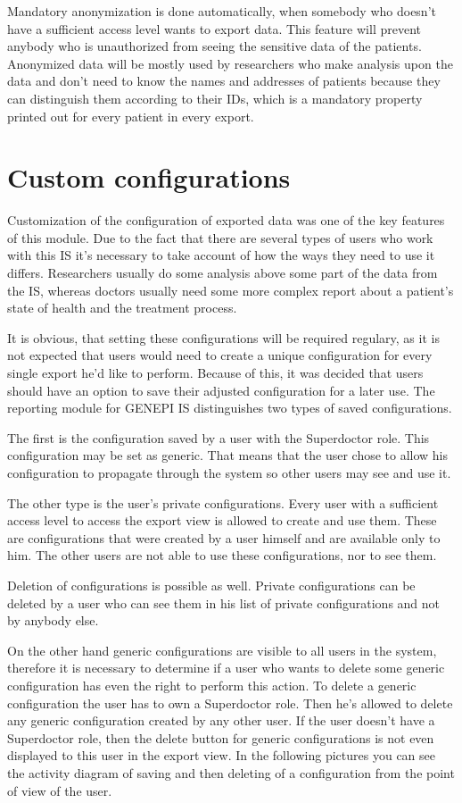 \documentclass[thesis=B,english]{FITthesis}[2012/10/20]
\begin{document}
Mandatory anonymization is done automatically, when somebody who doesn't have a sufficient access level wants to export data. This feature will prevent anybody who is unauthorized from seeing the sensitive data of the patients. Anonymized data will be mostly used by researchers who make analysis upon the data and don't need to know the names and addresses of patients because they can distinguish them according to their IDs, which is a mandatory property  printed out for every patient in every export.
\section{Custom configurations}
Customization of the configuration of exported data was one of the key features of this module. Due to the fact that there are several types of users who work with this IS it's necessary to take account of how the ways they need to use it differs. Researchers usually do some analysis above some part of the data from the IS, whereas doctors usually need some more complex report about a patient's state of health and the treatment process.

It is obvious, that setting these configurations will be required regulary, as it is not expected that users would need to create a unique configuration for every single export he'd like to perform. Because of this, it was decided that users should have an option to save their adjusted configuration for a later use. The reporting module for GENEPI IS distinguishes two types of saved configurations.

The first is the configuration saved by a user with the Superdoctor role. This configuration may be set as generic. That means that the user chose to allow his configuration to propagate through the system so other users may see and use it.

The other type is the user's private configurations. Every user with a sufficient access level to access the export view is allowed to create and use them. These are configurations that were created by a user himself and are available only to him. The other users are not able to use these configurations, nor to see them.

Deletion of configurations is possible as well. Private configurations can be deleted by a user who can see them in his list of private configurations and not by anybody else. 

On the other hand generic configurations are visible to all users in the system, therefore it is necessary to determine if a user who wants to delete some generic configuration has even the right to perform this action. To delete a generic configuration the user has to own a Superdoctor role. Then he's allowed to delete any generic configuration created by any other user. If the user doesn't have a Superdoctor role, then the delete button for generic configurations is not even displayed to this user in the export view.
In the following pictures you can see the activity diagram of saving and then deleting of a configuration from the point of view of the user.
\end{document}
